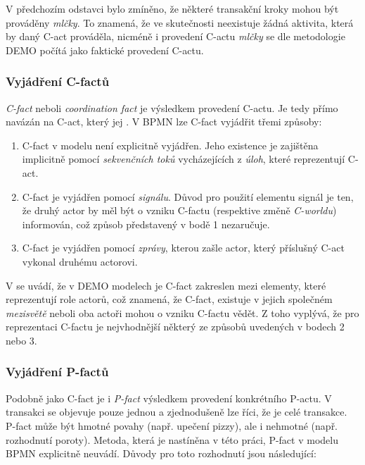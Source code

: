 \documentclass[]{article}
\begin{document}
V předchozím odstavci bylo zmíněno, že některé transakční kroky mohou být prováděny \textit{mlčky}. To znamená, že ve skutečnosti neexistuje žádná aktivita, která by daný C-act prováděla, nicméně i provedení C-actu \textit{mlčky} se dle metodologie DEMO počítá jako faktické provedení C-actu. \cite{Dietz2006}

\subsubsection{Vyjádření C-factů} \label{sec:vyjadreni_cfactu}
\textit{C-fact} neboli \textit{coordination fact} je výsledkem provedení C-actu. Je tedy přímo navázán na C-act, který jej . V BPMN lze C-fact vyjádřit třemi způsoby:

\begin{enumerate}
\item C-fact v modelu není explicitně vyjádřen. Jeho existence je zajištěna implicitně pomocí \textit{sekvenčních toků} vycházejících z \textit{úloh}, které reprezentují C-act.
\item C-fact je vyjádřen pomocí \textit{signálu}. Důvod pro použití elementu signál je ten, že druhý actor by měl být o vzniku C-factu (respektive změně \textit{C-worldu}) informován, což způsob představený v bodě 1 nezaručuje.
\item C-fact je vyjádřen pomocí \textit{zprávy}, kterou zašle actor, který příslušný C-act vykonal druhému actorovi.
\end{enumerate}

V \cite{Dietz2006} se uvádí, že v DEMO modelech je C-fact zakreslen mezi elementy, které reprezentují role actorů, což znamená, že C-fact, existuje v jejich společném \textit{mezisvětě} neboli oba actoři mohou o vzniku C-factu vědět. Z toho vyplývá, že pro reprezentaci C-factu je nejvhodnější některý ze způsobů uvedených v bodech 2 nebo 3.

\subsubsection{Vyjádření P-factů}
Podobně jako C-fact je i \textit{P-fact} výsledkem provedení konkrétního P-actu. V transakci se objevuje pouze jednou a zjednodušeně lze říci, že je  celé transakce. P-fact může být hmotné povahy (např. upečení pizzy), ale i nehmotné (např. rozhodnutí poroty). Metoda, která je nastíněna v této práci, P-fact v modelu BPMN explicitně neuvádí. Důvody pro toto rozhodnutí jsou následující:
\end{document}
